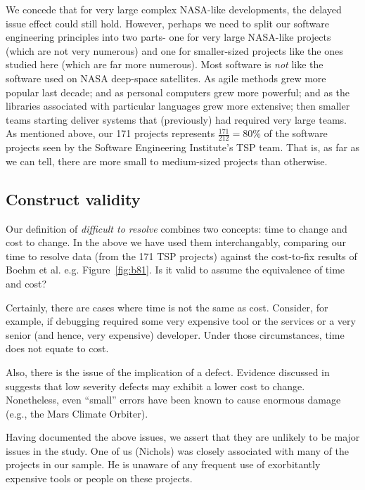 \documentclass[smallcondesed]{svjour3}
\newcommand{\fig}[1]{Figure~\ref{fig:#1}}
\begin{document}
We concede that for very large complex NASA-like developments, the delayed issue
effect could still hold. However, perhaps we need to split our software engineering principles
into two parts- one for   very large NASA-like projects (which are not very numerous)
and one for smaller-sized projects like the ones studied here (which are far more numerous).
Most software is {\em not} like the software used on NASA deep-space satellites.
As  agile methods grew more popular last decade; and as personal computers grew more powerful;
and as the libraries associated with particular languages grew more extensive; then smaller
teams starting  deliver systems that (previously) had required very large teams.
As mentioned above,
our  171 projects represents $\frac{171}{212}=80$\% of the software projects
seen by the Software Engineering Institute's TSP team.
That is, as far as we can tell,
there are more small to medium-sized projects than otherwise.



\subsection{Construct validity} 

Our definition of {\em difficult to resolve} combines two concepts: time to change and cost to
change. In the above we have used them interchangably, comparing our time to resolve data (from the 171 TSP projects) against the cost-to-fix results of Boehm et al. e.g. \fig{b81}.
Is it valid to assume the equivalence of time and cost?

Certainly, there are cases where time is not the same as cost. Consider, for example,
if debugging required some very expensive tool or the services or a very senior (and hence, very expensive)
developer. Under those circumstances, time does not equate to cost.

Also, there is the issue of the implication of  a defect. Evidence discussed in \cite{Shull02} suggests that low severity defects may exhibit a lower cost to change. Nonetheless, even ``small'' errors have been known to cause enormous damage (e.g., the Mars Climate Orbiter). 

Having documented the above issues, we assert that they are unlikely to be major issues in the study.
One of us (Nichols)
was closely associated with many of the projects in our sample. He is unaware of any frequent
use of exorbitantly expensive tools or people on these projects. 
\end{document}
